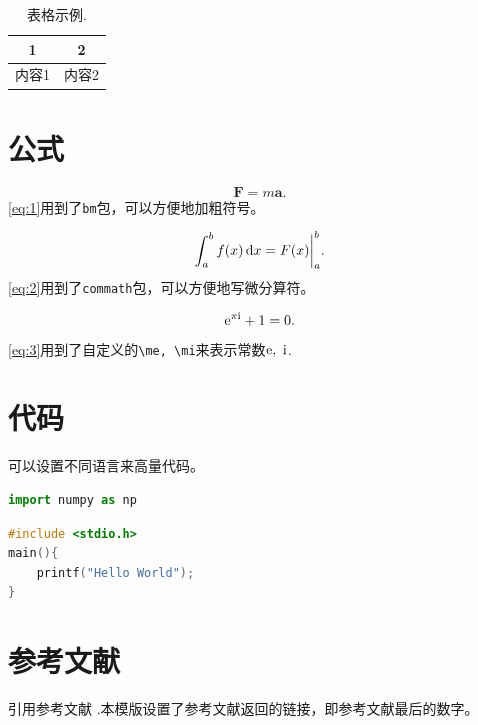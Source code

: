 \documentclass[12pt]{article}
\begin{document}
\begin{table}[htp]
	\centering
	\caption{表格示例.}
	\begin{tabular}{cc}
		\toprule  1 & 2     \\
		\midrule
		内容1       & 内容2 \\
		\bottomrule
	\end{tabular}
	\label{tab:1}
\end{table}

\section{公式}


\begin{equation}
	\bm{F} = m\bm{a}.
	\label{eq:1}
\end{equation}
\cref{eq:1}用到了\texttt{bm}包，可以方便地加粗符号。

\begin{equation}
	\int^b_a f(x) \dif x=F(x)\bigg|^b_a.
	\label{eq:2}
\end{equation}
\cref{eq:2}用到了\texttt{commath}包，可以方便地写微分算符。

\begin{equation}
	\mathrm{e} ^{\pi \mathrm{i}} + 1 = 0.
	\label{eq:3}
\end{equation}
\cref{eq:3}用到了自定义的\verb|\me, \mi|来表示常数$\mathrm{e},\ \mathrm{i}$.

\section{代码}

可以设置不同语言来高量代码。

\begin{lstlisting}[language=python]
import numpy as np
\end{lstlisting}

\begin{lstlisting}[language=c]
#include <stdio.h>
main(){
    printf("Hello World");
}
\end{lstlisting}

\section{参考文献}

引用参考文献 .本模版设置了参考文献返回的链接，即参考文献最后的数字。\cite{olsthoorn}




\end{document}
